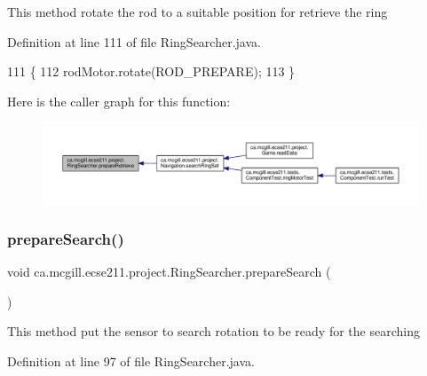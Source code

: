 This method rotate the rod to a suitable position for retrieve the ring 

Definition at line 111 of file Ring\+Searcher.\+java.


\begin{DoxyCode}
111                                 \{
112     rodMotor.rotate(ROD\_PREPARE);
113   \}
\end{DoxyCode}
Here is the caller graph for this function\+:\nopagebreak
\begin{figure}[H]
\begin{center}
\leavevmode
\includegraphics[width=350pt]{classca_1_1mcgill_1_1ecse211_1_1project_1_1_ring_searcher_a3de30b85b1445157d7f8572992de7651_icgraph}
\end{center}
\end{figure}
\mbox{\label{classca_1_1mcgill_1_1ecse211_1_1project_1_1_ring_searcher_abf31c36cadb144a4651b11f7fa37120a}} 
\subsubsection{\texorpdfstring{prepare\+Search()}{prepareSearch()}}
{\footnotesize\ttfamily void ca.\+mcgill.\+ecse211.\+project.\+Ring\+Searcher.\+prepare\+Search (\begin{DoxyParamCaption}{ }\end{DoxyParamCaption})}

This method put the sensor to search rotation to be ready for the searching 

Definition at line 97 of file Ring\+Searcher.\+java.


